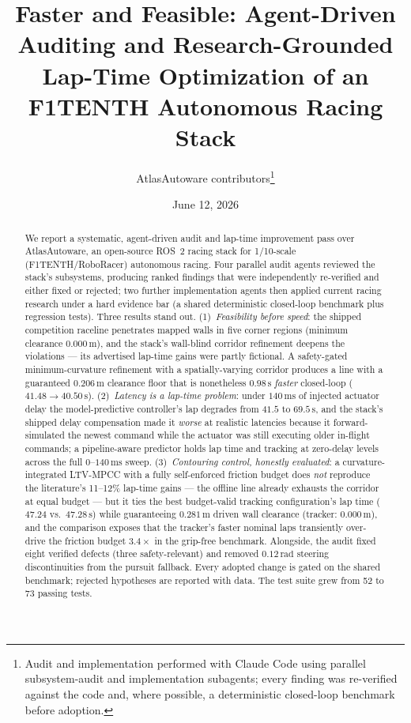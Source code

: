 \documentclass[11pt]{article}
\title{Faster and Feasible: Agent-Driven Auditing and Research-Grounded
       Lap-Time Optimization of an F1TENTH Autonomous Racing Stack}
\author{AtlasAutoware contributors\thanks{Audit and implementation performed
        with Claude Code using parallel subsystem-audit and implementation
        subagents; every finding was re-verified against the code and, where
        possible, a deterministic closed-loop benchmark before adoption.}}
\date{June 12, 2026}
\begin{document}
\maketitle

\begin{abstract}
We report a systematic, agent-driven audit and lap-time improvement pass
over AtlasAutoware, an open-source ROS~2 racing stack for 1/10-scale
(F1TENTH/RoboRacer) autonomous racing.  Four parallel audit agents
reviewed the stack's subsystems, producing ranked findings that were
independently re-verified and either fixed or rejected; two further
implementation agents then applied current racing research under a hard
evidence bar (a shared deterministic closed-loop benchmark plus
regression tests).  Three results stand out.  (1)~\emph{Feasibility
before speed}: the shipped competition raceline penetrates mapped walls
in five corner regions (minimum clearance $0.000\,\mathrm{m}$), and the
stack's wall-blind corridor refinement deepens the violations --- its
advertised lap-time gains were partly fictional.  A safety-gated
minimum-curvature refinement with a spatially-varying corridor
\cite{heilmeier,tumftm} produces a line with a guaranteed
$0.206\,\mathrm{m}$ clearance floor that is nonetheless
$0.98\,\mathrm{s}$ \emph{faster} closed-loop ($41.48 \rightarrow
40.50\,\mathrm{s}$).  (2)~\emph{Latency is a lap-time problem}: under
$140\,\mathrm{ms}$ of injected actuator delay the model-predictive
controller's lap degrades from $41.5$ to $69.5\,\mathrm{s}$, and the
stack's shipped delay compensation made it \emph{worse} at realistic
latencies because it forward-simulated the newest command while the
actuator was still executing older in-flight commands; a pipeline-aware
predictor holds lap time and tracking at zero-delay levels across the
full $0$--$140\,\mathrm{ms}$ sweep.
(3)~\emph{Contouring control, honestly evaluated}: a
curvature-integrated LTV-MPCC \cite{liniger,cimpcc} with a fully
self-enforced friction budget does \emph{not} reproduce the literature's
11--12\% lap-time gains --- the offline line already exhausts the
corridor at equal budget --- but it ties the best budget-valid tracking
configuration's lap time ($47.24$ vs.\ $47.28\,\mathrm{s}$) while
guaranteeing $0.281\,\mathrm{m}$ driven wall clearance (tracker:
$0.000\,\mathrm{m}$), and the comparison exposes that the tracker's
faster nominal laps transiently over-drive the friction budget
$3.4\times$ in the grip-free benchmark.
Alongside, the audit fixed eight verified defects (three
safety-relevant) and removed $0.12\,\mathrm{rad}$ steering
discontinuities from the pursuit fallback.  Every adopted change is
gated on the shared benchmark; rejected hypotheses are reported with
data.  The test suite grew from 52 to 73 passing tests.
\end{abstract}
\end{document}
